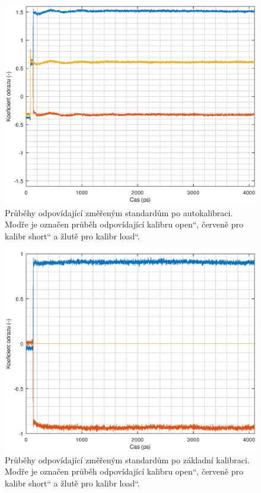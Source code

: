 \begin{figure}[htbp]
\includegraphics[width=\textwidth,keepaspectratio]{images/gui/standards_after_autocalibration.eps}\caption{Průběhy odpovídající změřeným standardům po autokalibraci. Modře je označen průběh odpovídající kalibru \quotedblbase open\textquotedblleft , červeně pro kalibr \quotedblbase short\textquotedblleft{} a žlutě pro kalibr \quotedblbase load\textquotedblleft .}\label{standards_after_autocalibration}
\end{figure}

\begin{figure}[htbp]
\includegraphics[width=\textwidth,keepaspectratio]{images/gui/standards_after_load_calibration.eps}\caption{Průběhy odpovídající změřeným standardům po základní kalibraci. Modře je označen průběh odpovídající kalibru \quotedblbase open\textquotedblleft , červeně pro kalibr \quotedblbase short\textquotedblleft{} a žlutě pro kalibr \quotedblbase load\textquotedblleft .}\label{standards_after_load_calibration}
\end{figure}

